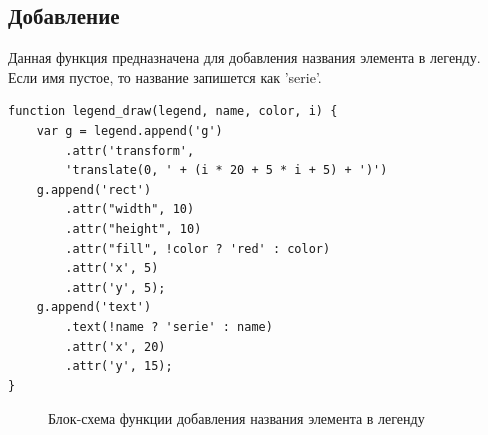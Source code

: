 \documentclass[a4paper,14pt]{extreport}
\begin{document}
\subsection{Добавление}
\hspace{4ex}Данная функция предназначена для добавления названия элемента в легенду. Если имя пустое, то название запишется как 'serie'.
\begin{verbatim}
function legend_draw(legend, name, color, i) {
    var g = legend.append('g')
        .attr('transform', 
        'translate(0, ' + (i * 20 + 5 * i + 5) + ')')
    g.append('rect')
        .attr("width", 10)
        .attr("height", 10)
        .attr("fill", !color ? 'red' : color)
        .attr('x', 5)
        .attr('y', 5);
    g.append('text')
        .text(!name ? 'serie' : name)
        .attr('x', 20)
        .attr('y', 15);
}
\end{verbatim}
\begin{figure}[h]
\caption{Блок-схема функции добавления названия элемента в легенду}
\label{ris:image}
\end{figure}
\end{document}
